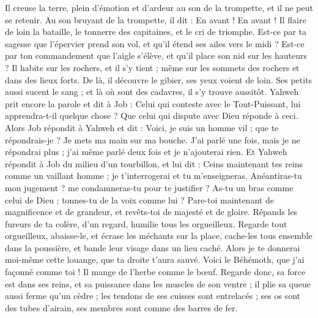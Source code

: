 \begin{multicols}{2}
Il creuse la terre, plein d'émotion et d'ardeur au son de la trompette, et il ne peut se retenir. 
Au son bruyant de la trompette, il dit : En avant ! En avant ! Il flaire de loin la bataille, le tonnerre des capitaines, et le cri de triomphe.
Est-ce par ta sagesse que l'épervier prend son vol, et qu'il étend ses ailes vers le midi ?
Est-ce par ton commandement que l'aigle s'élève, et qu'il place son nid sur les hauteurs ?
Il habite sur les rochers, et il s'y tient ; même sur les sommets des rochers et dans des lieux forts. 
De là, il découvre le gibier, ses yeux voient de loin.
Ses petits aussi sucent le sang ; et là où sont des cadavres, il s'y trouve aussitôt.
Yahweh prit encore la parole et dit à Job :
Celui qui conteste avec le Tout-Puissant, lui apprendra-t-il quelque chose ? Que celui qui dispute avec Dieu réponde à ceci.
Alors Job répondit à Yahweh et dit :
Voici, je suis un homme vil ; que te répondrais-je ? Je mets ma main sur ma bouche.
J'ai parlé une fois, mais je ne répondrai plus ; j'ai même parlé deux fois et je n'ajouterai rien.
\VerseOne{}Et Yahweh répondit à Job du milieu d'un tourbillon, et lui dit :
Ceins maintenant tes reins comme un vaillant homme ; je t'interrogerai et tu m'enseigneras.
Anéantiras-tu mon jugement ? me condamneras-tu pour te justifier ?
As-tu un bras comme celui de Dieu ; tonnes-tu de la voix comme lui ?
Pare-toi maintenant de magnificence et de grandeur, et revêts-toi de majesté et de gloire.
Répands les fureurs de ta colère, d'un regard, humilie tous les orgueilleux.
Regarde tout orgueilleux, abaisse-le, et écrase les méchants sur la place,
cache-les tous ensemble dans la poussière, et bande leur visage dans un lieu caché. 
Alors je te donnerai moi-même cette louange, que ta droite t'aura sauvé. 
Voici le Béhémoth, que j'ai façonné comme toi ! Il mange de l'herbe comme le bœuf.
Regarde donc, sa force est dans ses reins, et sa puissance dans les muscles de son ventre ;
il plie sa queue aussi ferme qu'un cèdre ; les tendons de ses cuisses sont entrelacés ;
ses os sont des tubes d'airain, ses membres sont comme des barres de fer.

\end{multicols}
